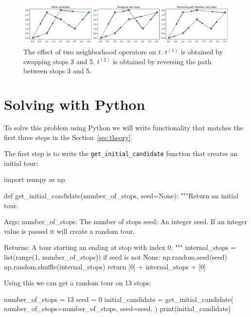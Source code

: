 \begin{figure}[!hbtp]
    \begin{center}
        \includegraphics[width=\textwidth]{./assets/tsp-effect-of-neighbourhood-operators/main.pdf}
    \end{center}
    \caption{The effect of two neighborhood operators on \(t\). \(t^{(1)}\) is
    obtained by swapping stops 3 and 5. \(t^{(2)}\) is obtained by reversing the
    path between stops 3 and 5.}
    \label{fig:tsp-effect-of-neighbourhood-operators}
\end{figure}

\section{Solving with Python}\label{sec:solving-with-python}

To solve this problem using Python we will write functionality that matches the
first three steps in the Section~\ref{sec:theory}.

The first step is to write the \texttt{get_initial_candidate}
function that creates an initial tour:

\begin{pyin}
import numpy as np


def get_initial_candidate(number_of_stops, seed=None):
    """Return an initial tour.

    Args:
        number_of_stops: The number of stops
        seed: An integer seed. If an integer value is
              passed it will create a random tour.

    Returns:
        A tour starting an ending at stop with index 0.
    """
    internal_stops = list(range(1, number_of_stops))
    if seed is not None:
        np.random.seed(seed)
        np.random.shuffle(internal_stops)
    return [0] + internal_stops + [0]
\end{pyin}

Using this we can get a random tour on 13 stops:

\begin{pyin}
number_of_stops = 13
seed = 0
initial_candidate = get_initial_candidate(
    number_of_stops=number_of_stops,
    seed=seed,
)
print(initial_candidate)
\end{pyin}

